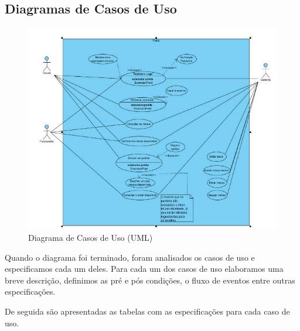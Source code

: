 \subsection{Diagramas de Casos de Uso}

\begin{figure}[!hbt]
    \centering
    \includegraphics[width=14cm]{Resources/Previous/image-089.jpg}
    \caption{Diagrama de Casos de Uso (UML)}
    
\end{figure}

Quando o diagrama foi terminado, foram analisados os casos de uso e especificamos cada um deles. Para cada um dos casos de uso elaboramos uma breve descrição, definimos as pré e pós condições, o fluxo de eventos entre outras especificações.

De seguida são apresentadas as tabelas com as especificações para cada caso de uso.

